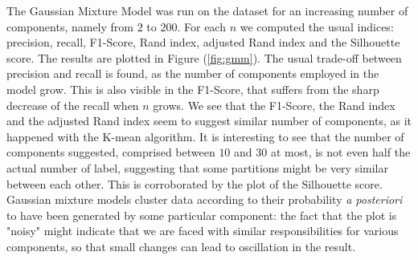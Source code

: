 \documentclass[a4paper]{article}
\begin{document}
 	The Gaussian Mixture Model was run on the dataset for an increasing number of components, namely from $2$ to $200$. For each $n$ we computed the usual indices: precision, recall, F1-Score, Rand index, adjusted Rand index and the Silhouette score. The results are plotted in Figure (\ref{fig:gmm}).
 	The usual trade-off between precision and recall is found, as the number of components employed in the model grow. This is also visible in the F1-Score, that suffers from the sharp decrease of the recall when $n$ grows. We see that the F1-Score, the Rand index and the adjusted Rand index seem to suggest similar number of components, as it happened with the K-mean algorithm. It is interesting to see that the number of components suggested, comprised between $10$ and $30$ at most, is not even half the actual number of label, suggesting that some partitions might be very similar between each other. This is corroborated by the plot of the Silhouette score. Gaussian mixture models cluster data according to their probability \textit{a posteriori} to have been generated by some particular component: the fact that the plot is "noisy" might indicate that we are faced with similar responsibilities for various components, so that small changes can lead to oscillation in the result.
 	
\end{document}
